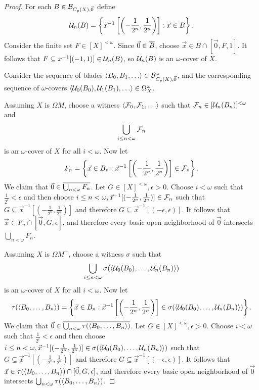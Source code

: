 \documentclass{amsart}
\theoremstyle{plain}
\theoremstyle{definition}
\theoremstyle{remark}
\theoremstyle{plain}
\theoremstyle{definition}
\theoremstyle{remark}
\begin{document}
\begin{proof}
  For each \(B\in\mathcal{B}_{C_p(X),\vec 0}\) define
  \[
    \mathcal{U}_n(B)
      =
    \left\{
      \vec x^{-1}\left[\left(-\frac{1}{2^n},\frac{1}{2^n}\right)\right]
    :
      \vec x\in B
    \right\}
  .\]
  Consider the finite set \(F\in[X]^{<\omega}\). Since
  \(\vec 0\in\overline{B}\), choose \(\vec x\in B\cap[\vec 0,F,1]\).
  It follows that \(F\subseteq x^{-1}[(-1,1)]\in\mathcal{U}_n(B)\),
  so \(\mathcal{U}_n(B)\) is an \(\omega\)-cover of \(X\).

  Consider the sequence of blades
  \(\<B_0,B_1,\dots\>\in\mc B_{C_p(X),\vec 0}^\omega\), and the
  corresponding sequence of \(\omega\)-covers
  \(\<\mc U_0(B_0),\mc U_1(B_1),\dots\>\in \Omega_X^\omega\).

  Assuming \(X\) is \(\Omega M\), choose a witness
  \(\<\mc F_0,\mc F_1,\dots\>\) such that
  \(\mathcal{F}_n\in[\mathcal{U}_n(B_n)]^{<\omega}\) and
  \[
    \bigcup_{i\leq n<\omega} \mathcal{F}_n
  \]
  is an \(\omega\)-cover of \(X\) for all \(i<\omega\).
  Now let
  \[
    F_n
      =
    \left\{
      \vec x\in B_n
    :
      \vec x^{-1}\left[\left(-\frac{1}{2^n},\frac{1}{2^n}\right)\right]
        \in
      \mathcal{F}_n
    \right\}
  .\]
  We claim that \(\vec 0\in\overline{\bigcup_{n<\omega}F_n}\).
  Let \(G\in[X]^{<\omega},\epsilon>0\). Choose \(i<\omega\) such that
  \(\frac{1}{2^i}<\epsilon\) and then choose
  \(i\leq n<\omega,\vec x^{-1}[(-\frac{1}{2^n},\frac{1}{2^n})]\in\mathcal{F}_n\)
  such that \(G\subseteq \vec x^{-1}[(-\frac{1}{2^n},\frac{1}{2^n})]\)
  and therefore \(G\subseteq \vec x^{-1}[(-\epsilon,\epsilon)]\).
  It follows that \(\vec x\in F_n\cap[\vec 0,G,\epsilon]\), and therefore
  every basic open neighborhood of \(\vec 0\) intersects
  \(\bigcup_{n<\omega}F_n\).

  Assuming \(X\) is \(\Omega M^+\), choose a witness
  \(\sigma\) such that
  \[
    \bigcup_{i\leq n<\omega} \sigma(\langle\mathcal{U}_0(B_0),\dots,\mathcal{U}_n(B_n)\rangle)
  \]
  is an \(\omega\)-cover of \(X\) for all \(i<\omega\).
  Now let
  \[
    \tau(\langle B_0,\dots,B_n\rangle)
      =
    \left\{
      \vec x\in B_n
    :
      \vec x^{-1}\left[\left(-\frac{1}{2^n},\frac{1}{2^n}\right)\right]
        \in
      \sigma(\langle\mathcal{U}_0(B_0),\dots,\mathcal{U}_n(B_n)\rangle)
    \right\}
  .\]
  We claim that \(\vec 0\in\overline{\bigcup_{n<\omega}\tau(\langle B_0,\dots,B_n\rangle)}\).
  Let \(G\in[X]^{<\omega},\epsilon>0\). Choose \(i<\omega\) such that
  \(\frac{1}{2^i}<\epsilon\) and then choose
  \(i\leq n<\omega,\vec x^{-1}[(-\frac{1}{2^n},\frac{1}{2^n})]\in\sigma(\langle\mathcal{U}_0(B_0),\dots,\mathcal{U}_n(B_n)\rangle)\)
  such that \(G\subseteq \vec x^{-1}[(-\frac{1}{2^n},\frac{1}{2^n})]\)
  and therefore \(G\subseteq \vec x^{-1}[(-\epsilon,\epsilon)]\).
  It follows that \(\vec x\in \tau(\langle B_0,\dots,B_n\rangle)\cap[\vec 0,G,\epsilon]\), and therefore
  every basic open neighborhood of \(\vec 0\) intersects
  \(\bigcup_{n<\omega}\tau(\langle B_0,\dots,B_n\rangle)\).


\end{proof}
\end{document}
